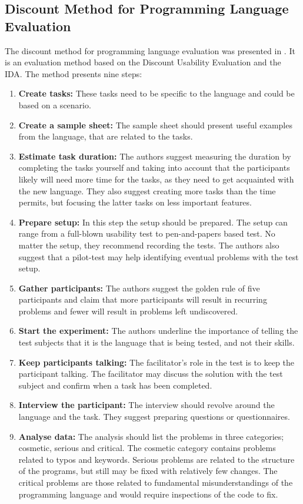 \subsection{Discount Method for Programming Language Evaluation}
The discount method for programming language evaluation was presented in \cite{kurtev2016discount}. It is an evaluation method based on the Discount Usability Evaluation and the \ac{IDA}. The method presents nine steps:
\begin{enumerate}
    \item \textbf{Create tasks:} These tasks need to be specific to the language and could be based on a scenario.
    \item \textbf{Create a sample sheet:} The sample sheet should present useful examples from the language, that are related to the tasks.
    \item \textbf{Estimate task duration:} The authors suggest measuring the duration by completing the tasks yourself and taking into account that the participants likely will need more time for the tasks, as they need to get acquainted with the new language. They also suggest creating more tasks than the time permits, but focusing the latter tasks on less important features.
    \item \textbf{Prepare setup:} In this step the setup should be prepared. The setup can range from a full-blown usability test to pen-and-papers based test. No matter the setup, they recommend recording the tests. The authors also suggest that a pilot-test may help identifying eventual problems with the test setup.
    \item \textbf{Gather participants:} The authors suggest the golden rule of five participants and claim that more participants will result in recurring problems and fewer will result in problems left undiscovered.
    \item \textbf{Start the experiment:} The authors underline the importance of telling the test subjects that it is the language that is being tested, and not their skills.
    \item \textbf{Keep participants talking:} The facilitator's role in the test is to keep the participant talking. The facilitator may discuss the solution with the test subject and confirm when a task has been completed.
    \item \textbf{Interview the participant:} The interview should revolve around the language and the task. They suggest preparing questions or questionnaires.
    \item \textbf{Analyse data:} The analysis should list the problems in three categories; cosmetic, serious and critical. The cosmetic category contains problems related to typos and keywords. Serious problems are related to the structure of the programs, but still may be fixed with relatively few changes. The critical problems are those related to fundamental misunderstandings of the programming language and would require inspections of the code to fix.
\end{enumerate}

